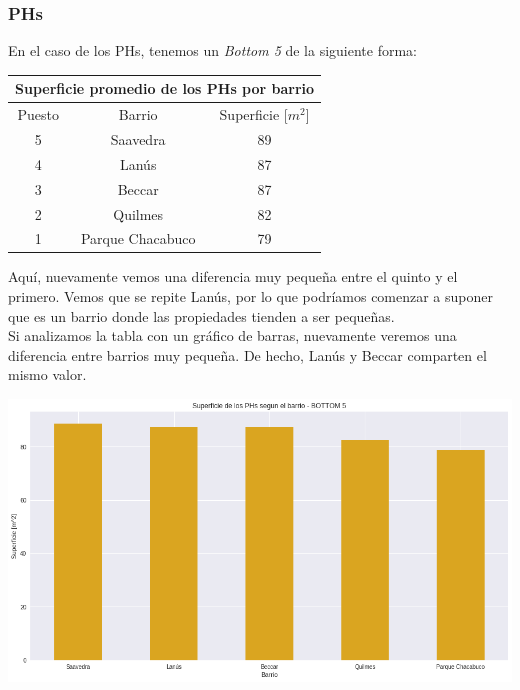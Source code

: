 \documentclass[a4paper, 10pt]{article}
\newcommand\tab[1][0.5cm]{\hspace*{#1}}
\begin{document}
        \subsubsection{PHs}
          En el caso de los PHs, tenemos un \emph{Bottom 5} de la siguiente forma:
          \begin{center}
            \begin{tabular}{ |c|c|c| }
              \hline
              \multicolumn{3}{|c|}{Superficie promedio de los PHs por barrio}\\
              \hline
              \hline
              Puesto & Barrio & Superficie [$m^2$]\\
              \hline
              5 & Saavedra & 89\\
              4 & Lanús & 87\\
              3 & Beccar & 87\\
              2 & Quilmes & 82\\
              1 & Parque Chacabuco & 79\\
              \hline
            \end{tabular}
          \end{center}
          \tab Aquí, nuevamente vemos una diferencia muy pequeña entre el quinto y el primero. Vemos que se repite Lanús,
          por lo que podríamos comenzar a suponer que es un barrio donde las propiedades tienden a ser pequeñas. \\
          \tab Si analizamos la tabla con un gráfico de barras, nuevamente veremos una diferencia entre barrios muy
          pequeña. De hecho, Lanús y Beccar comparten el mismo valor.
          \begin{center}
                  \includegraphics[width=\textwidth]{images/phSurfaceBottomBar}
            \end{center}
\end{document}
